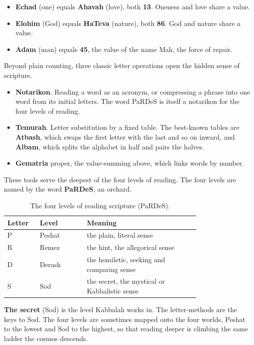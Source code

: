 \begin{itemize}
 \item \textbf{Echad} (one) equals \textbf{Ahavah} (love), both \textbf{13}.
 Oneness and love share a value.
 \item \textbf{Elohim} (God) equals \textbf{HaTeva} (nature), both \textbf{86}.
 God and nature share a value.
 \item \textbf{Adam} (man) equals \textbf{45}, the value of the name Mah, the
 force of repair.
\end{itemize}

Beyond plain counting, three classic letter operations open the hidden sense of
scripture.

\begin{itemize}
 \item \textbf{Notarikon}. Reading a word as an acronym, or compressing a phrase
 into one word from its initial letters. The word PaRDeS is itself a
 notarikon for the four levels of reading.
 \item \textbf{Temurah}. Letter substitution by a fixed table. The best-known
 tables are \textbf{Atbash}, which swaps the first letter with the last and
 so on inward, and \textbf{Albam}, which splits the alphabet in half and
 pairs the halves.
 \item \textbf{Gematria} proper, the value-summing above, which links words by
 number.
\end{itemize}

These tools serve the deepest of the four levels of reading. The four levels are
named by the word \textbf{PaRDeS}, an orchard.

\begin{longtable}{L{0.10\linewidth} L{0.20\linewidth} L{0.48\linewidth}}
\caption{The four levels of reading scripture (PaRDeS).}\\
\toprule
\textbf{Letter} & \textbf{Level} & \textbf{Meaning} \\
\midrule
P & Peshat & the plain, literal sense \\
R & Remez & the hint, the allegorical sense \\
D & Derash & the homiletic, seeking and comparing sense \\
S & Sod & the secret, the mystical or Kabbalistic sense \\
\bottomrule
\end{longtable}

\textbf{The secret} (Sod) is the level Kabbalah works in. The letter-methods are
the keys to Sod. The four levels are sometimes mapped onto the four worlds, Peshat
to the lowest and Sod to the highest, so that reading deeper is climbing the same
ladder the cosmos descends.
